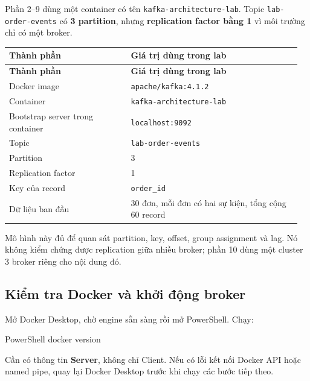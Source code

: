 Phần 2--9 dùng một container có tên \texttt{kafka-\allowbreak{}architecture-\allowbreak{}lab}. Topic \texttt{lab-\allowbreak{}order-\allowbreak{}events} có \textbf{3 partition}, nhưng \textbf{replication factor bằng 1} vì môi trường chỉ có một broker.


\begingroup\small
\renewcommand{\arraystretch}{1.2}
\begin{longtable}{@{}p{0.4\linewidth}p{0.56\linewidth}@{}}
\toprule
\rowcolor{rowLavender}
\textbf{Thành phần} & \textbf{Giá trị dùng trong lab} \\
\midrule
\endfirsthead
\toprule
\rowcolor{rowLavender}
\textbf{Thành phần} & \textbf{Giá trị dùng trong lab} \\
\midrule
\endhead
\bottomrule
\endfoot
Docker image & \texttt{apache/\allowbreak{}kafka:4.\allowbreak{}1.\allowbreak{}2} \\
Container & \texttt{kafka-\allowbreak{}architecture-\allowbreak{}lab} \\
Bootstrap server trong container & \texttt{localhost:9092} \\
Topic & \texttt{lab-\allowbreak{}order-\allowbreak{}events} \\
Partition & 3 \\
Replication factor & 1 \\
Key của record & \texttt{order\_\allowbreak{}id} \\
Dữ liệu ban đầu & 30 đơn, mỗi đơn có hai sự kiện, tổng cộng 60 record \\
\end{longtable}
\endgroup

Mô hình này đủ để quan sát partition, key, offset, group assignment và lag. Nó không kiểm chứng được replication giữa nhiều broker; phần 10 dùng một cluster 3 broker riêng cho nội dung đó.


\subsection{Kiểm tra Docker và khởi động broker}

Mở Docker Desktop, chờ engine sẵn sàng rồi mở PowerShell. Chạy:


\begin{aivncodebox}[language={}]{PowerShell}
docker version
\end{aivncodebox}

Cần có thông tin \textbf{Server}, không chỉ Client. Nếu có lỗi kết nối Docker API hoặc named pipe, quay lại Docker Desktop trước khi chạy các bước tiếp theo.


